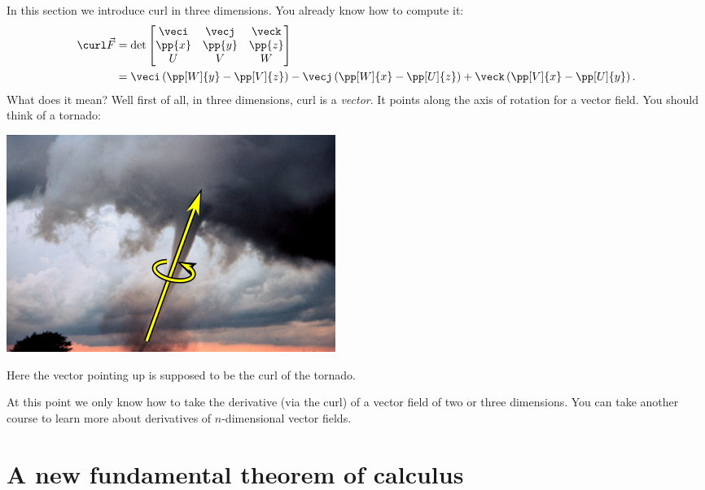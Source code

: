 \documentclass{ximera}
\begin{document}
In this section we introduce curl in three dimensions. You already know how to compute it:
\begin{align*}
  \curl \vec F &= \det
  \begin{bmatrix}
    \veci & \vecj & \veck \\
    \pp{x} & \pp{y} & \pp{z}\\
    U & V & W
  \end{bmatrix}\\
  &= \veci\left(\pp[W]{y}-\pp[V]{z}\right)-
  \vecj\left(\pp[W]{x}-\pp[U]{z}\right)+
  \veck\left(\pp[V]{x}-\pp[U]{y}\right).
\end{align*}
What does it mean? Well first of all, in three dimensions, curl is a \textit{vector}. It points along the axis of rotation for a vector field. You should think of a tornado:
\begin{image}%
  \includegraphics{tornado.png}
\end{image}
Here the vector pointing up is supposed to be the curl of the tornado.






At this point we only know how to take the derivative (via the curl)
of a vector field of two or three dimensions.  You can take another
course to learn more about derivatives of $n$-dimensional vector
fields.







\section{A new fundamental theorem of calculus}
\end{document}
